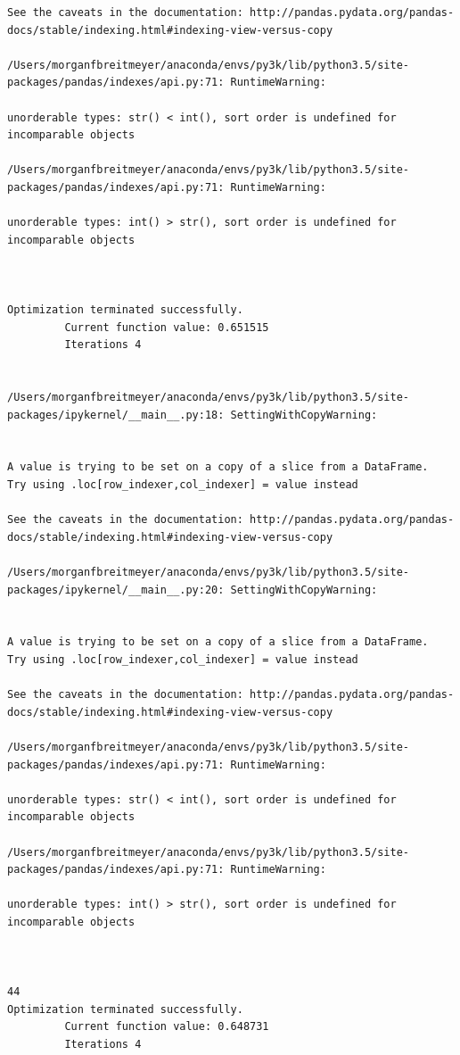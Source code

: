 \begin{lstlisting}
See the caveats in the documentation: http://pandas.pydata.org/pandas-docs/stable/indexing.html#indexing-view-versus-copy

/Users/morganfbreitmeyer/anaconda/envs/py3k/lib/python3.5/site-packages/pandas/indexes/api.py:71: RuntimeWarning:

unorderable types: str() < int(), sort order is undefined for incomparable objects

/Users/morganfbreitmeyer/anaconda/envs/py3k/lib/python3.5/site-packages/pandas/indexes/api.py:71: RuntimeWarning:

unorderable types: int() > str(), sort order is undefined for incomparable objects



Optimization terminated successfully.
         Current function value: 0.651515
         Iterations 4


/Users/morganfbreitmeyer/anaconda/envs/py3k/lib/python3.5/site-packages/ipykernel/__main__.py:18: SettingWithCopyWarning:


A value is trying to be set on a copy of a slice from a DataFrame.
Try using .loc[row_indexer,col_indexer] = value instead

See the caveats in the documentation: http://pandas.pydata.org/pandas-docs/stable/indexing.html#indexing-view-versus-copy

/Users/morganfbreitmeyer/anaconda/envs/py3k/lib/python3.5/site-packages/ipykernel/__main__.py:20: SettingWithCopyWarning:


A value is trying to be set on a copy of a slice from a DataFrame.
Try using .loc[row_indexer,col_indexer] = value instead

See the caveats in the documentation: http://pandas.pydata.org/pandas-docs/stable/indexing.html#indexing-view-versus-copy

/Users/morganfbreitmeyer/anaconda/envs/py3k/lib/python3.5/site-packages/pandas/indexes/api.py:71: RuntimeWarning:

unorderable types: str() < int(), sort order is undefined for incomparable objects

/Users/morganfbreitmeyer/anaconda/envs/py3k/lib/python3.5/site-packages/pandas/indexes/api.py:71: RuntimeWarning:

unorderable types: int() > str(), sort order is undefined for incomparable objects



44
Optimization terminated successfully.
         Current function value: 0.648731
         Iterations 4



\end{lstlisting}
